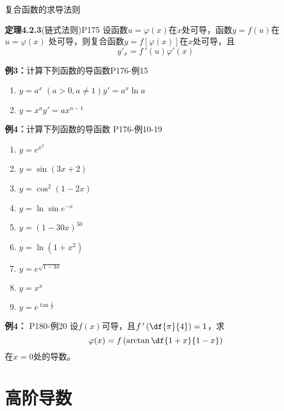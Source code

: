 \begin{frame}{复合函数的求导法则}
	\linespread{1.5}\pause 
	\begin{block}{{\bf 定理4.2.3}(链式法则)\hfill P175}
		设函数$u=\varphi(x)$在$x$处可导，函数$y=f(u)$在$u=\varphi(x)$
		处可导，则复合函数$y=f[\varphi(x)]$在$x$处可导，且
		$$y'_x=f\,'(u)\varphi'(x)$$
	\end{block}\pause 
	\begin{exampleblock}{{\bf 例3：}计算下列函数的导函数\hfill P176-例15}
		\begin{enumerate}
		  \item $y=a^x\;(a>0,a\ne 1)$\pause \hfill $y'=a^x\ln a$\pause 
		  \item $y=x^a$\pause \hfill $y'=ax^{a-1}$
		\end{enumerate}
	\end{exampleblock}
\end{frame}

\begin{frame}
	\linespread{1.2}
	\begin{exampleblock}{{\bf 例4：}计算下列函数的导函数 \hfill P176-例10-19}
		\begin{enumerate}
		  \item $y=e^{x^2}$\pause 
		  \item $y=\sin (3x+2)$\pause 
		  \item $y=\cos^2(1-2x)$\pause 
		  \item $y=\ln\sin e^{-x}$\pause 
		  \item $y=(1-30x)^{50}$\pause 
		  \item $y=\ln(1+x^2)$\pause 
		  \item $y=e^{\sqrt{1-3x}}$\pause 
		  \item $y=x^x$\pause 
		  \item $y=e^{\tan\frac 1x}$
		\end{enumerate}
	\end{exampleblock}
\end{frame}

\begin{frame}
	\linespread{1.2}
	\begin{exampleblock}{{\bf 例4：} \hfill P180-例20}
		设$f(x)$可导，且$f\,'\left(\df{\pi}{4}\right)=1$，求
		$$\varphi(x)=f\left(\arctan\df{1+x}{1-x}\right)$$
		在$x=0$处的导数。
	\end{exampleblock}
\end{frame}

\section{高阶导数}

